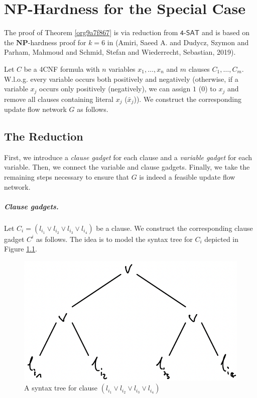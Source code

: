 \documentclass[fontsize=11pt,paper=a4]{book}
\begin{document}
\chapter{\(\textbf{NP}\)-Hardness for the Special Case}
\label{sec:org96c25fa}

The proof of Theorem \ref{org9a7f867} is via reduction from \(\textsf{4-SAT}\) and is based on the \(\textbf{NP}\)-hardness proof for \(k=6\) in (Amiri, Saeed A. and Dudycz, Szymon and Parham, Mahmoud and Schmid, Stefan and Wiederrecht, Sebastian, 2019).

Let \(C\) be a 4CNF formula with \(n\) variables \(x_1,\dots,x_n\) and \(m\) clauses \(C_1,\dots,C_m\).
W.l.o.g. every variable occurs both positively and negatively (otherwise, if a variable \(x_j\) occurs only positively (negatively), we can assign \(1\) (\(0\)) to \(x_j\) and remove all clauses containing literal \(x_j\) (\(\bar{x}_j\))).
We construct the corresponding update flow network \(G\) as follows.

\section{The Reduction}
\label{sec:orgce5b6e3}

First, we introduce a \emph{clause gadget} for each clause and a \emph{variable gadget} for each variable.
Then, we connect the variable and clause gadgets.
Finally, we take the remaining steps necessary to ensure that \(G\) is indeed a feasible update flow network.

\paragraph{Clause gadgets.}
Let \(C_i=(l_{i_1}\vee l_{i_2}\vee l_{i_3}\vee l_{i_4})\) be a clause.
We construct the corresponding clause gadget \(C^i\) as follows.
The idea is to model the syntax tree for \(C_i\) depicted in Figure \ref{fig:org04fc70c}.

\begin{figure}[htbp]
\centering
\includegraphics[width=.9\linewidth]{../assets/Screen Shot 2023-02-14 at 15.05.37.png}
\caption{\label{fig:org04fc70c}A syntax tree for clause \((l_{i_1}\vee l_{i_2}\vee l_{i_3}\vee l_{i_4})\)}
\end{figure}
\end{document}
